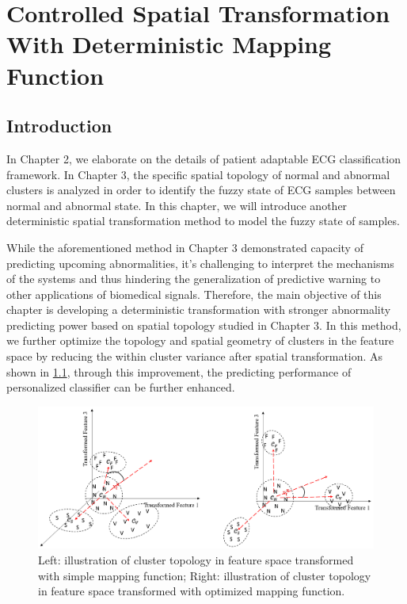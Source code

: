 \chapter{Controlled Spatial Transformation With Deterministic Mapping Function}
\section{Introduction}


 In Chapter 2, we elaborate on the details of patient adaptable ECG classification framework. In Chapter 3, the specific spatial topology of normal and abnormal clusters is analyzed in order to identify the fuzzy state of ECG samples between normal and abnormal state. In this chapter, we will introduce another deterministic spatial transformation method to model the fuzzy state of samples. %
 
 While the aforementioned method in Chapter 3 demonstrated capacity of predicting upcoming abnormalities, it's challenging to interpret the mechanisms of the systems and thus hindering the generalization of predictive warning to other applications of biomedical signals. Therefore, the main objective of this chapter is developing a deterministic transformation with stronger abnormality predicting power based on spatial topology studied in Chapter 3. In this method, we further optimize the topology and spatial geometry of clusters in the feature space by reducing the within cluster variance after spatial transformation. As shown in \ref{fig:topo2}, through this improvement, the predicting performance of personalized classifier can be further enhanced.
 
 
\begin{figure}[t]
\centering
\includegraphics[scale=.42]{Fig/topo2.png}
\caption{Left: illustration of cluster topology in feature space transformed with simple mapping function; Right: illustration of cluster topology in feature space transformed with optimized mapping function.}
\label{fig:topo2}
\end{figure}

